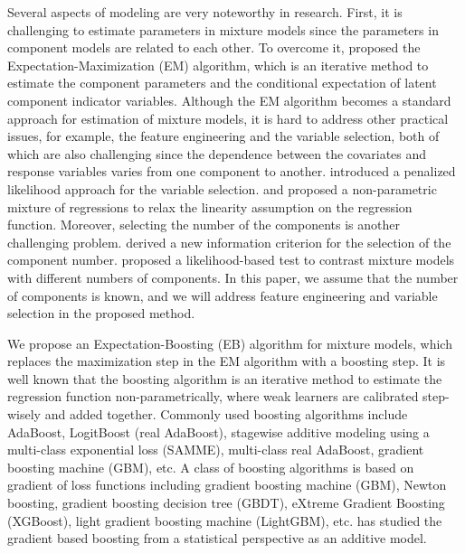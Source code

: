 \documentclass[11pt]{article}
\numberwithin{equation}{section}
\begin{document}
Several aspects of modeling are very noteworthy in research. First, it is challenging to estimate parameters in mixture models since the parameters in component models are related to each other.
To overcome it,  \citet{dempster1977maximum} proposed the Expectation-Maximization (EM) algorithm, which is an iterative method to estimate the component parameters and the conditional expectation of latent component indicator variables. 
Although the EM algorithm becomes a standard approach for estimation of mixture models, it is hard to address other practical issues, for example, the feature engineering and the variable selection, both of which are also challenging since the dependence between the covariates and response variables varies from one component to another.  
\citet{khalili2007variable} introduced a penalized likelihood approach for the variable selection.
\citet{huang2012mixture} and \citet{huang2013nonparametric} proposed a non-parametric mixture of regressions to relax the linearity assumption on the regression function.
Moreover, selecting the number of the components is another challenging problem.
\citet{naik2007extending} derived a new information criterion for the selection of the component number.
\citet{kasahara2015testing} proposed a likelihood-based test to contrast mixture models with different numbers of components. 
In this paper, we assume that the number of components is known, and we will address  feature engineering and variable selection in the proposed method.

We propose an Expectation-Boosting (EB) algorithm for mixture models, which replaces the maximization step in the EM algorithm with a boosting step. 
It is well known that the boosting algorithm is an iterative method to estimate the regression function non-parametrically, where weak learners are calibrated step-wisely and added together.
Commonly used boosting algorithms include 
AdaBoost, LogitBoost (real AdaBoost),
stagewise additive modeling using a multi-class exponential loss (SAMME), multi-class real AdaBoost, gradient boosting machine (GBM), etc. 
A class of boosting algorithms is based on gradient of loss functions including {gradient boosting machine (GBM)}, Newton boosting, gradient boosting decision tree (GBDT), {eXtreme Gradient Boosting (XGBoost)}, {light gradient boosting machine (LightGBM)}, etc.
\citet{friedman2001greedy} has studied the gradient based boosting from a statistical perspective as an additive model.
\end{document}
